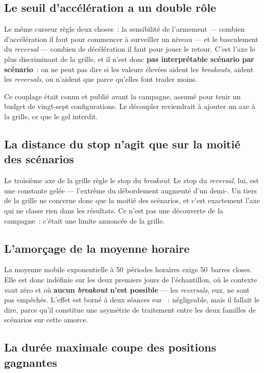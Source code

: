 \subsection{Le seuil d'accélération a un double rôle}

Le même curseur règle deux choses~: la sensibilité de l'armement --- combien
d'accélération il faut pour commencer à surveiller un niveau --- et le
basculement du \emph{reversal} --- combien de décélération il faut pour jouer
le retour. C'est l'axe le plus discriminant de la grille, et il n'est donc
\textbf{pas interprétable scénario par scénario}~: on ne peut pas dire si les
valeurs élevées aident les \emph{breakouts}, aident les \emph{reversals}, ou
n'aident que parce qu'elles font trader moins.

Ce couplage était connu et publié avant la campagne, assumé pour tenir un
budget de vingt-sept configurations. Le découpler reviendrait à ajouter un axe
à la grille, ce que le gel interdit.

\subsection{La distance du stop n'agit que sur la moitié des scénarios}

Le troisième axe de la grille règle le stop du \emph{breakout}. Le stop du
\emph{reversal}, lui, est une constante gelée --- l'extrême du débordement
augmenté d'un demi-. Un tiers de la grille ne concerne donc que la
moitié des scénarios, et c'est exactement l'axe qui ne classe rien dans les
résultats. Ce n'est pas une découverte de la campagne~: c'était une limite
annoncée de la grille.

\subsection{L'amorçage de la moyenne horaire}

La moyenne mobile exponentielle à 50~périodes horaires exige 50~barres closes.
Elle est donc indéfinie sur les deux premiers jours de l'échantillon, où le
contexte vaut zéro et où \textbf{aucun \emph{breakout} n'est possible} --- les
\emph{reversals}, eux, ne sont pas empêchés. L'effet est borné à deux séances
sur \XTenSampleSessions~: négligeable, mais il fallait le dire, parce qu'il
constitue une asymétrie de traitement entre les deux familles de scénarios sur
cette amorce.

\subsection{La durée maximale coupe des positions gagnantes}

